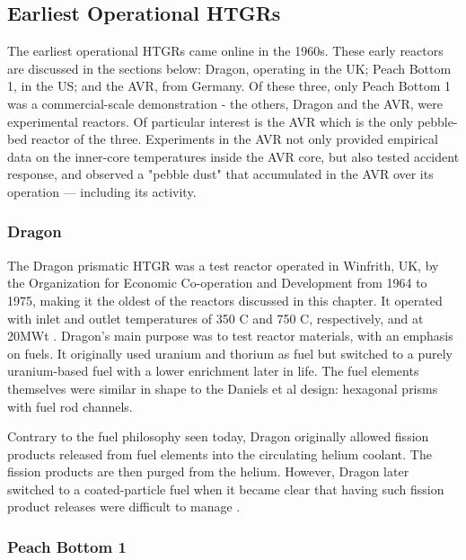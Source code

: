 \subsection{Earliest Operational HTGRs}

The earliest operational HTGRs came online in the 1960s.  These early reactors are discussed in the sections below: Dragon, operating in the UK; Peach Bottom 1, in the US; and the AVR, from Germany.  Of these three, only Peach Bottom 1 was a commercial-scale demonstration - the others, Dragon and the AVR, were experimental reactors.  Of particular interest is the AVR which is the only pebble-bed reactor of the three.  Experiments in the AVR not only provided empirical data on the inner-core temperatures inside the AVR core, but also tested accident response, and observed a "pebble dust" that accumulated in the AVR over its operation --- including its activity.

\subsubsection{Dragon}
\label{dragon}

The Dragon prismatic HTGR was a test reactor operated in Winfrith, UK, by the Organization for Economic Co-operation and Development from 1964 to 1975, making it the oldest of the reactors discussed in this chapter.  It operated with inlet and outlet temperatures of 350 \textdegree C and 750 \textdegree C, respectively, and at 20MWt \cite{beck_high_nodate}.  Dragon's main purpose was to test reactor materials, with an emphasis on fuels.  It originally used uranium and thorium as fuel but switched to a purely uranium-based fuel with a lower enrichment later in life.  The fuel elements themselves were similar in shape to the Daniels et al design: hexagonal prisms with fuel rod channels.

Contrary to the fuel philosophy seen today, Dragon originally allowed fission products released from fuel elements into the circulating helium coolant.  The fission products are then purged from the helium.  However, Dragon later switched to a coated-particle fuel when it became clear that having such fission product releases were difficult to manage \cite{simnad_early_1991}.

\subsubsection{Peach Bottom 1}\
\label{peach}

